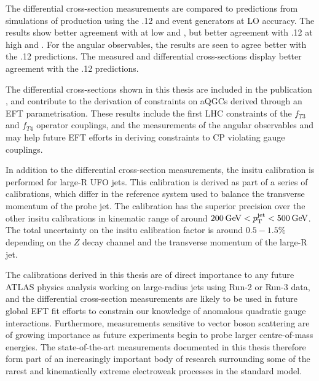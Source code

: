 The differential cross-section measurements are compared to predictions from simulations of \ewwy production using the .12 and  event generators at LO accuracy. The results show better agreement with  at low \mjj and \ptjj, but better agreement with .12 at high \mjj and \ptjj. For the angular observables, the results are seen to agree better with the .12 predictions. The measured \mly and \leppt differential cross-sections display better agreement with the .12 predictions. 

The differential cross-sections shown in this thesis are included in the publication \cite{VBSWy:VBSWy}, and contribute to the derivation of constraints on aQGCs derived through an EFT parametrisation. These results include the first LHC constraints of the $f_{T3}$ and $f_{T4}$ operator couplings, and the measurements of the angular observables \dphisigned and \lepgamdphi may help future EFT efforts in deriving constraints to CP violating gauge couplings.

In addition to the differential cross-section measurements, the \zjets insitu calibration is performed for large-R UFO jets. This calibration is derived as part of a series of calibrations, which differ in the reference system used to balance the transverse momentum of the probe jet. The \zjets calibration has the superior precision over the other insitu calibrations in kinematic range of around $200\hspace{2pt}\text{Ge\kern -0.1em V}<p_{\text{T}}^{\text{jet}}<500\hspace{2pt}\text{Ge\kern -0.1em V}$. The total uncertainty on the insitu calibration factor is around $0.5-1.5\%$ depending on the $Z$ decay channel and the transverse momentum of the large-R jet.

The calibrations derived in this thesis are of direct importance to any future ATLAS physics analysis working on large-radius jets using Run-2 or Run-3 data, and the differential cross-section measurements are likely to be used in future global EFT fit efforts to constrain our knowledge of anomalous quadratic gauge interactions. Furthermore, measurements sensitive to vector boson scattering are of growing importance as future experiments begin to probe larger centre-of-mass energies. The state-of-the-art measurements documented in this thesis therefore form part of an increasingly important body of research surrounding some of the rarest and kinematically extreme electroweak processes in the standard model.
